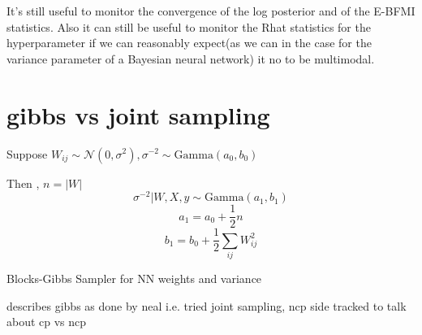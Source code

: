 \documentclass[]{report}
\begin{document}
It's still useful to monitor the convergence of the log posterior and of the E-BFMI statistics. Also it can still be useful to monitor the Rhat statistics for the hyperparameter if we can reasonably expect(as we can in the case for the variance parameter of a Bayesian neural network) it no to be multimodal. 



\section{gibbs vs joint sampling}
Suppose $W_{ij} \sim \mathcal{N}(0,\sigma^2), \sigma^{-2} \sim \text{Gamma}(a_0,b_0) $

Then , $n = |W|$ 
\[\sigma^{-2}|W,X,y \sim \text{Gamma}(a_1,b_1)\]
\[a_1 = a_0 + \frac{1}{2} n  \]
\[b_1 = b_0 + \frac{1}{2} \sum_{ij} W_{ij}^2 \]

\begin{algorithm}

\caption{Blocks-Gibbs Sampler for NN weights and variance}
\end{algorithm}



describes gibbs as done by neal 
i.e. tried joint sampling, ncp 
side tracked to talk about cp vs ncp 
\end{document}
